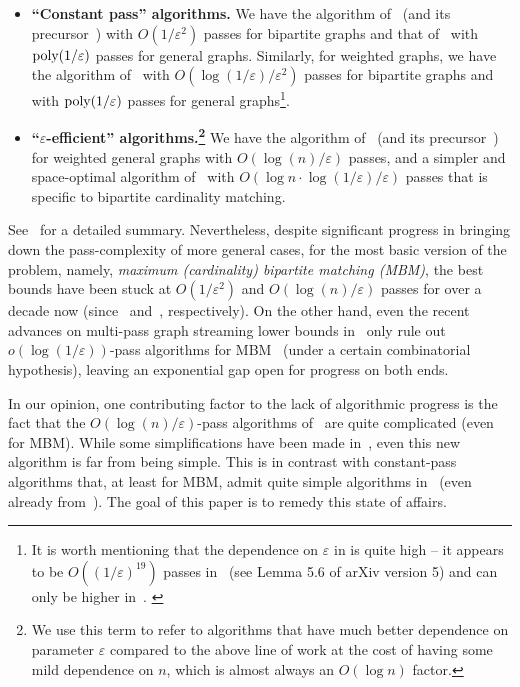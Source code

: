 \documentclass{article}
\newcommand{\eps}{\varepsilon}
\newcommand{\poly}{\mbox{\rm poly}}
\begin{document}
\begin{itemize}[itemsep=5pt]
	\item \textbf{``Constant pass'' algorithms.} We have the algorithm of~\cite{AssadiLT21} (and its precursor~\cite{AhnG11}) with $O(1/\eps^2)$ passes for {bipartite} graphs and that of~\cite{FischerMU22} with $\poly{(1/\eps)}$ passes for general graphs. Similarly, for weighted graphs, 
	we have the algorithm of~\cite{AhnG11} with $O(\log{(1/\eps)}/\eps^2)$ passes for bipartite graphs and~\cite{HuangS23} with $\poly{(1/\eps)}$ passes for general graphs\footnote{It is worth mentioning that the dependence on
	$\eps$ in \cite{FischerMU22, HuangS23} is quite high -- it appears to be $O((1/\eps)^{19})$ passes in~\cite{FischerMU22} (see Lemma 5.6 of arXiv version 5) and can only be higher in~\cite{HuangS23}. \label{footnote:eps}}. 

	\item \textbf{``$\eps$-efficient'' algorithms.\footnote{We use this term to refer to algorithms that have  much better dependence on parameter $\eps$ compared to the above line of work at the cost of having some mild dependence on $n$, which
	is almost always an $O(\log{n})$ factor.}} We have the algorithm of~\cite{AhnG15} (and its precursor~\cite{AhnG11b}) for weighted general graphs with $O(\log{\!(n)}/\eps)$ passes, and a simpler and space-optimal algorithm of~\cite{AssadiJJST22}
	with $O(\log{n}\cdot\log{(1/\eps)}/\eps)$ passes that is specific to bipartite cardinality matching.  
\end{itemize}

See~ for a detailed summary. Nevertheless, despite significant progress in bringing down the pass-complexity of more general cases, for the most basic version of the problem, namely, \emph{maximum (cardinality) bipartite matching (MBM)}, 
the best bounds have been stuck at $O(1/\eps^2)$  and $O(\log{\!(n)}/\eps)$ passes for over a decade now (since~\cite{AhnG11} and~\cite{AhnG11b}, respectively). On the other hand, 
even the recent advances on multi-pass graph streaming lower bounds in~\cite{AssadiR20,ChenKPSSY21,Assadi22,AssadiS23,KonradN24} only rule out $o(\log{(1/\eps)})$-pass algorithms for MBM~\cite{AssadiS23} (under a certain combinatorial hypothesis), leaving an exponential gap open for progress on both ends. 

In our opinion, one contributing factor to the lack of algorithmic progress is the fact that the $O(\log{\!(n)}/\eps)$-pass algorithms of~\cite{AhnG11b,AhnG15} are quite complicated (even for MBM). While some simplifications have been 
made in~\cite{AssadiJJST22}, even this new algorithm is far from being simple. This is in contrast with constant-pass algorithms that, at least for MBM, 
admit quite simple algorithms in~\cite{AssadiLT21} (even already from~\cite{AhnG11}). The goal of this paper is to remedy this state of affairs. 
\end{document}
